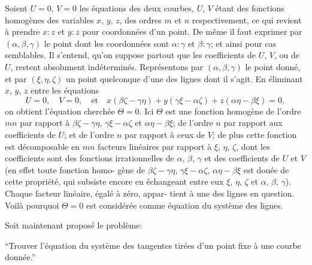 \documentclass[11pt]{article}
\begin{document}
Soient $U = 0$, $V = 0$ les \'equations des deux courbes, $U$, $V$ \'etant des fonctions
homog\`enes des variables $x$, $y$, $z$, des ordres $m$ et $n$ respectivement, ce qui revient \`a
prendre $x : z$ et $y : z$ pour coordonn\'ees d'un point. De m\^eme il faut exprimer par
$(\alpha, \beta, \gamma)$ le point dont les coordonn\'ees sont $\alpha : \gamma$ et $\beta : \gamma$; et ainsi pour cas
semblables. Il s'entend, qu'on suppose partout que les coefficients de $U$, $V$, ou de $U$,
restent absolument ind\'etermin\'es. Repr\'esentons par $(\alpha, \beta, \gamma)$ le point donn\'e, et par
$(\xi, \eta, \zeta)$ un point quelconque d'une des lignes dont il s'agit. En \'eliminant $x$, $y$, $z$
entre les \'equations
\[
U = 0, \quad V = 0,\quad\text{et}\quad x(\beta\zeta - \gamma\eta) + y(\gamma\xi - \alpha\zeta) + z(\alpha\eta - \beta\xi) = 0 \tag{1},
\]
on obtient l'\'equation cherch\'ee $\Theta = 0$. Ici $\Theta$ est une fonction homog\`ene de l'ordre $m n$
par rapport \`a $\beta\zeta - \gamma\eta$, $\gamma\xi - \alpha\zeta$ et $\alpha\eta - \beta\xi$; de l'ordre $n$ par rapport aux coefficients de
$U$; et de l'ordre $n$ par rapport \`a ceux de $V$; de plus cette fonction est d\'ecomposable
en $m n$ facteurs lin\'eaires par rapport \`a $\xi$, $\eta$, $\zeta$, dont les coefficients sont des fonctions
irrationnelles de $\alpha$, $\beta$, $\gamma$ et des coefficients de $U$ et $V$ (en effet toute fonction homo-
g\`ene de $\beta\zeta - \gamma\eta$, $\gamma\xi - \alpha\zeta$, $\alpha\eta - \beta\xi$ est dou\'ee de cette propri\'et\'e, qui subsiste encore en
\'echangeant entre eux $\xi$, $\eta$, $\zeta$ et $\alpha$, $\beta$, $\gamma$). Chaque facteur lin\'eaire, \'egal\'e \`a z\'ero, appar-
tient \`a une des lignes en question. Voil\`a pourquoi $\Theta = 0$ est consid\'er\'ee comme
\'equation du syst\`eme des lignes.

\medskip
Soit maintenant propos\'e le probl\`eme:

``Trouver l'\'equation du syst\`eme des tangentes tir\'ees d'un point fixe \`a une courbe
donn\'ee.''
\end{document}
